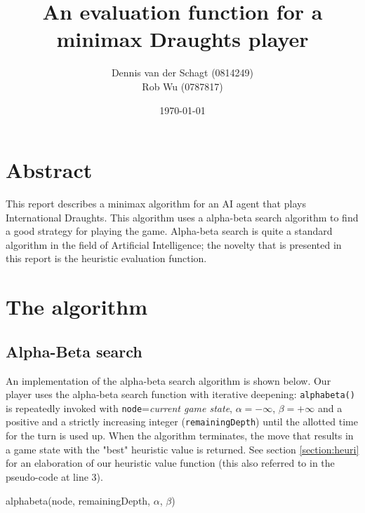 \documentclass[11pt,a4paper]{article}
\title{An evaluation function for a minimax Draughts player}
\author{
Dennis van der Schagt (0814249)\\
Rob Wu (0787817)
}
\date{\today}
\begin{document}
\maketitle
\newpage
\section*{Abstract}
This report describes a minimax algorithm for an AI agent that plays International Draughts. This algorithm uses a alpha-beta search algorithm to find a good strategy for playing the game. Alpha-beta search is quite a standard algorithm in the field of Artificial Intelligence; the novelty that is presented in this report is the heuristic evaluation function.

\section{The algorithm}
\subsection{Alpha-Beta search}
An implementation of the alpha-beta search algorithm is shown below. Our player uses the alpha-beta search function with iterative deepening: \texttt{alphabeta()} is repeatedly invoked with \texttt{node}=\textit{current game state}, $\alpha = -\infty$, $\beta = +\infty$ and a positive and a strictly increasing integer (\texttt{remainingDepth}) until the allotted time for the turn is used up. When the algorithm terminates, the move that results in a game state with the "best" heuristic value is returned. See section \ref{section:heuri} for an elaboration of our heuristic value function (this also referred to in the pseudo-code at line 3).

\begin{function}[H]
	\DontPrintSemicolon
	\caption{alphabeta(node, remainingDepth, $\alpha$, $\beta$)}
\end{function}
\end{document}
